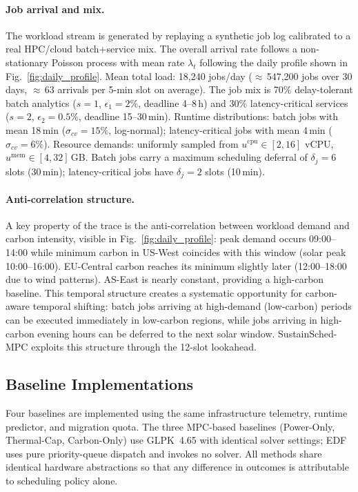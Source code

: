 \documentclass[a4paper,fleqn]{cas-dc}
\begin{document}
\paragraph{Job arrival and mix.}
The workload stream is generated by replaying a synthetic job log calibrated to a real HPC/cloud batch+service mix. The overall arrival rate follows a non-stationary Poisson process with mean rate $\lambda_t$ following the daily profile shown in Fig.~\ref{fig:daily_profile}. Mean total load: 18,240 jobs/day ($\approx$\,547,200 jobs over 30 days, $\approx$\,63 arrivals per 5-min slot on average). The job mix is 70\% delay-tolerant batch analytics ($s=1$, $\epsilon_1=2\%$, deadline 4--8\,h) and 30\% latency-critical services ($s=2$, $\epsilon_2=0.5\%$, deadline 15--30\,min). Runtime distributions: batch jobs with mean 18\,min ($\sigma_{cv}=15\%$, log-normal); latency-critical jobs with mean 4\,min ($\sigma_{cv}=6\%$). Resource demands: uniformly sampled from $u^{\mathrm{cpu}} \in [2,16]$ vCPU, $u^{\mathrm{mem}} \in [4,32]$\,GB. Batch jobs carry a maximum scheduling deferral of $\delta_j = 6$ slots (30\,min); latency-critical jobs have $\delta_j = 2$ slots (10\,min).

\paragraph{Anti-correlation structure.}
A key property of the trace is the anti-correlation between workload demand and carbon intensity, visible in Fig.~\ref{fig:daily_profile}: peak demand occurs 09:00--14:00 while minimum carbon in US-West coincides with this window (solar peak 10:00--16:00). EU-Central carbon reaches its minimum slightly later (12:00--18:00 due to wind patterns). AS-East is nearly constant, providing a high-carbon baseline. This temporal structure creates a systematic opportunity for carbon-aware temporal shifting: batch jobs arriving at high-demand (low-carbon) periods can be executed immediately in low-carbon regions, while jobs arriving in high-carbon evening hours can be deferred to the next solar window. SustainSched-MPC exploits this structure through the 12-slot lookahead.

\subsection{Baseline Implementations}
\label{sec:baselines}

Four baselines are implemented using the same infrastructure telemetry, runtime predictor, and migration quota. The three MPC-based baselines (Power-Only, Thermal-Cap, Carbon-Only) use GLPK~4.65 with identical solver settings; EDF uses pure priority-queue dispatch and invokes no solver. All methods share identical hardware abstractions so that any difference in outcomes is attributable to scheduling policy alone.
\end{document}
